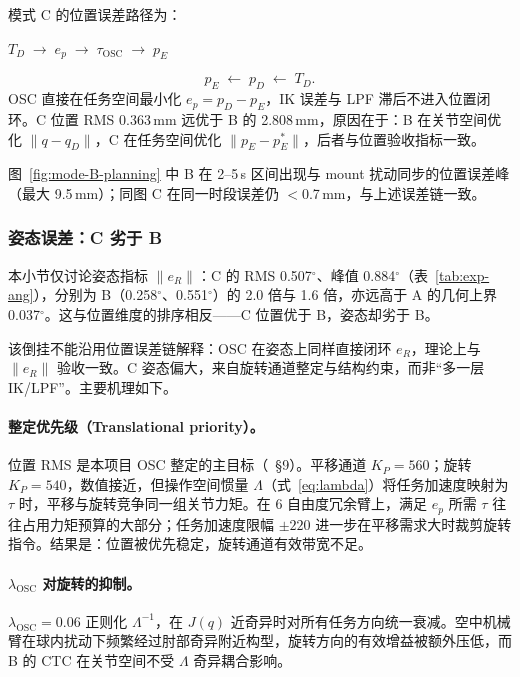 \documentclass[UTF8, a4paper, 12pt]{ctexart}
\begin{document}
模式 C 的位置误差路径为：
\begin{center}
$T_D \;\rightarrow\; e_p \;\rightarrow\; \tau_{\mathrm{OSC}} \;\rightarrow\; p_E$
\end{center}
\begin{equation}
    p_E \;\leftarrow\; p_D \;\leftarrow\; T_D.
    \label{eq:error-chain-c}
\end{equation}
OSC 直接在任务空间最小化 $e_p=p_D-p_E$，IK 误差与 LPF 滞后不进入位置闭环。C 位置 RMS 0.363\,mm 远优于 B 的 2.808\,mm，原因在于：B 在关节空间优化 $\|q-q_D\|$，C 在任务空间优化 $\|p_E-p_E^*\|$，后者与位置验收指标一致。

图~\ref{fig:mode-B-planning} 中 B 在 2--5\,s 区间出现与 mount 扰动同步的位置误差峰（最大 9.5\,mm）；同图 C 在同一时段误差仍 $<$0.7\,mm，与上述误差链一致。

\subsubsection{姿态误差：C 劣于 B}
\label{sec:result-att-bc}

本小节仅讨论姿态指标 $\|e_R\|$：C 的 RMS 0.507$^\circ$、峰值 0.884$^\circ$（表~\ref{tab:exp-ang}），分别为 B（0.258$^\circ$、0.551$^\circ$）的 2.0 倍与 1.6 倍，亦远高于 A 的几何上界 0.037$^\circ$。这与位置维度的排序相反——C 位置优于 B，姿态却劣于 B。

该倒挂不能沿用位置误差链解释：OSC 在姿态上同样直接闭环 $e_R$，理论上与 $\|e_R\|$ 验收一致。C 姿态偏大，来自旋转通道整定与结构约束，而非``多一层 IK/LPF''。主要机理如下。

\paragraph{整定优先级（Translational priority）。}
位置 RMS 是本项目 OSC 整定的主目标（~\S9）。平移通道 $K_P=560$；旋转 $K_P=540$，数值接近，但操作空间惯量 $\Lambda$（式~\eqref{eq:lambda}）将任务加速度映射为 $\tau$ 时，平移与旋转竞争同一组关节力矩。在 6 自由度冗余臂上，满足 $e_p$ 所需 $\tau$ 往往占用力矩预算的大部分；任务加速度限幅 $\pm 220$ 进一步在平移需求大时裁剪旋转指令。结果是：位置被优先稳定，旋转通道有效带宽不足。

\paragraph{$\lambda_{\mathrm{OSC}}$ 对旋转的抑制。}
$\lambda_{\mathrm{OSC}}=0.06$ 正则化 $\Lambda^{-1}$，在 $J(q)$ 近奇异时对所有任务方向统一衰减。空中机械臂在球内扰动下频繁经过肘部奇异附近构型，旋转方向的有效增益被额外压低，而 B 的 CTC 在关节空间不受 $\Lambda$ 奇异耦合影响。
\end{document}
